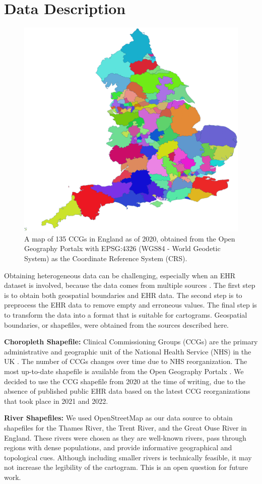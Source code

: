 \documentclass[Afour,sagev,times]{sagej}
\newcommand{\bobgraph}[1]{\noindent\textbf{#1}}
\begin{document}
\section{Data Description}

 {
  \begin{figure}[b!]
      \centering
      \includegraphics[width=0.6\columnwidth]{ccg.png}
      \caption{A map of 135 CCGs in England as of 2020, obtained from the Open Geography Portalx \cite{opengeographyportalxOpen} with EPSG:4326 (WGS84 - World Geodetic System) as the Coordinate Reference System (CRS).}
      \label{fig:ccg}
  \end{figure}
 }

Obtaining heterogeneous data can be challenging, especially when an EHR dataset is involved, because the data comes from multiple sources \cite{wang2021EHR}. The first step is to obtain both geospatial boundaries and EHR data. The second step is to preprocess the EHR data to remove empty and erroneous values. The final step is to transform the data into a format that is suitable for cartograms. Geospatial boundaries, or shapefiles, were obtained from the sources described here.

\bobgraph{Choropleth Shapefile:} Clinical Commissioning Groups (CCGs) are the primary administrative and geographic unit of the National Health Service (NHS) in the UK \cite{nhsNHS}. The number of CCGs changes over time due to NHS reorganization. The most up-to-date shapefile is available from the Open Geography Portalx \cite{opengeographyportalxOpen}. We decided to use the CCG shapefile from 2020 at the time of writing, due to the absence of published public EHR data based on the latest CCG reorganizations that took place in 2021 and 2022.

\bobgraph{River Shapefiles:} We used OpenStreetMap \cite{openstreetmapRelation} as our data source to obtain shapefiles for the Thames River, the Trent River, and the Great Ouse River in England. These rivers were chosen as they are well-known rivers, pass through regions with dense populations, and provide informative geographical and topological cues. Although including smaller rivers is technically feasible, it may not increase the legibility of the cartogram. This is an open question for future work.
\end{document}
